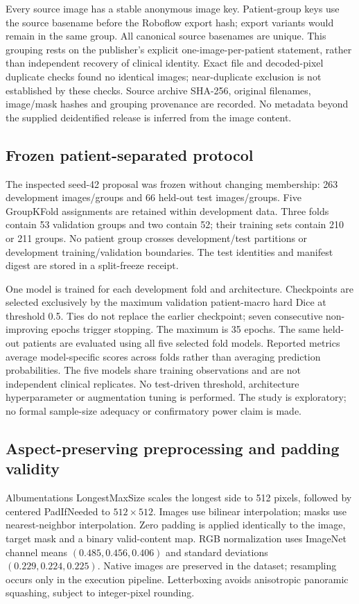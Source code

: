 \documentclass[11pt]{article}
\begin{document}
Every source image has a stable anonymous image key. Patient-group keys use the source basename before the Roboflow export hash; export variants would remain in the same group. All canonical source basenames are unique. This grouping rests on the publisher's explicit one-image-per-patient statement, rather than independent recovery of clinical identity. Exact file and decoded-pixel duplicate checks found no identical images; near-duplicate exclusion is not established by these checks. Source archive SHA-256, original filenames, image/mask hashes and grouping provenance are recorded. No metadata beyond the supplied deidentified release is inferred from the image content.

\subsection{Frozen patient-separated protocol}
The inspected seed-42 proposal was frozen without changing membership: 263 development images/groups and 66 held-out test images/groups. Five GroupKFold assignments are retained within development data. Three folds contain 53 validation groups and two contain 52; their training sets contain 210 or 211 groups. No patient group crosses development/test partitions or development training/validation boundaries. The test identities and manifest digest are stored in a split-freeze receipt.

One model is trained for each development fold and architecture. Checkpoints are selected exclusively by the maximum validation patient-macro hard Dice at threshold 0.5. Ties do not replace the earlier checkpoint; seven consecutive non-improving epochs trigger stopping. The maximum is 35 epochs. The same held-out patients are evaluated using all five selected fold models. Reported metrics average model-specific scores across folds rather than averaging prediction probabilities. The five models share training observations and are not independent clinical replicates. No test-driven threshold, architecture hyperparameter or augmentation tuning is performed. The study is exploratory; no formal sample-size adequacy or confirmatory power claim is made.

\subsection{Aspect-preserving preprocessing and padding validity}
Albumentations LongestMaxSize scales the longest side to 512 pixels, followed by centered PadIfNeeded to $512\times512$. Images use bilinear interpolation; masks use nearest-neighbor interpolation. Zero padding is applied identically to the image, target mask and a binary valid-content map. RGB normalization uses ImageNet channel means $(0.485,0.456,0.406)$ and standard deviations $(0.229,0.224,0.225)$. Native images are preserved in the dataset; resampling occurs only in the execution pipeline. Letterboxing avoids anisotropic panoramic squashing, subject to integer-pixel rounding.
\end{document}
